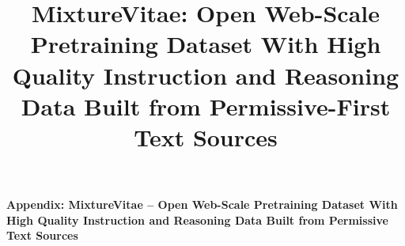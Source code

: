 \documentclass[10pt]{article}
\title{MixtureVitae: Open Web-Scale Pretraining Dataset With High Quality Instruction and Reasoning Data Built from Permissive-First Text Sources}
\begin{document}
\maketitle

\begin{abstract}

\end{abstract}














\clearpage

\begin{center}
{\Large\bf Appendix: MixtureVitae -- Open Web-Scale Pretraining Dataset With High Quality Instruction and Reasoning Data Built from Permissive Text Sources}
\end{center}

\appendix











\end{document}
